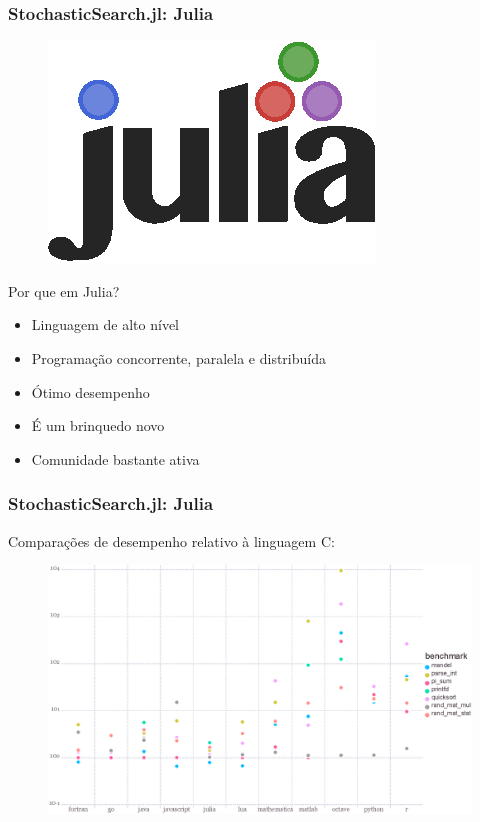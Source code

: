 \documentclass[10pt, compress]{beamer}
\begin{document}
\begin{frame}[fragile]
    \frametitle{StochasticSearch.jl: Julia}
    \begin{figure}[H]
        \centering
        \includegraphics[width=.24\textwidth]{julialogo}
    \end{figure}%
    Por que em Julia?
    \begin{itemize}
        \item Linguagem de \alert{alto nível}
            \pause
        \item Programação \alert{concorrente}, \alert{paralela} e \alert{distribuída}
            \pause
        \item Ótimo \alert{desempenho}
            \pause
        \item É um brinquedo \alert{novo}
        \item Comunidade bastante \alert{ativa}
    \end{itemize}
    \let\thefootnote\relax{}
\end{frame}

\begin{frame}[fragile]
    \frametitle{StochasticSearch.jl: Julia}
    Comparações de desempenho relativo à linguagem \alert{C}:
    \begin{figure}[H]
        \centering
        \includegraphics[width=1\textwidth]{juliabenchmarks}
    \end{figure}%
    \let\thefootnote\relax{}
\end{frame}
\end{document}
